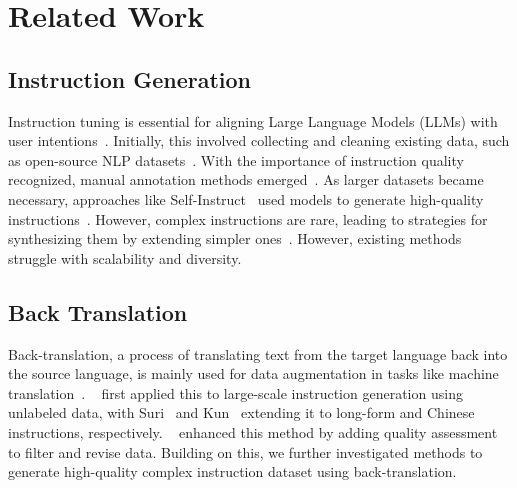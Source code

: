 
\section{Related Work}

\subsection{Instruction Generation}

Instruction tuning is essential for aligning Large Language Models (LLMs) with user intentions~\cite{ouyang2022training,cao2023instruction}. Initially, this involved collecting and cleaning existing data, such as open-source NLP datasets~\cite{wang2023far,ding2023enhancing}. With the importance of instruction quality recognized, manual annotation methods emerged~\cite{wang2023far,zhou2024lima}. As larger datasets became necessary, approaches like Self-Instruct~\cite{wang2022self} used models to generate high-quality instructions~\cite{guo2024human}. However, complex instructions are rare, leading to strategies for synthesizing them by extending simpler ones~\cite{xu2023wizardlm,sun2024conifer,he2024can}. However, existing methods struggle with scalability and diversity.


\subsection{Back Translation}

Back-translation, a process of translating text from the target language back into the source language, is mainly used for data augmentation in tasks like machine translation~\cite{sennrich2015improving, hoang2018iterative}. ~\citet{li2023self} first applied this to large-scale instruction generation using unlabeled data, with Suri~\cite{pham2024suri} and Kun~\cite{zheng2024kun} extending it to long-form and Chinese instructions, respectively. ~\citet{nguyen2024better} enhanced this method by adding quality assessment to filter and revise data. Building on this, we further investigated methods to generate high-quality complex instruction dataset using back-translation.


